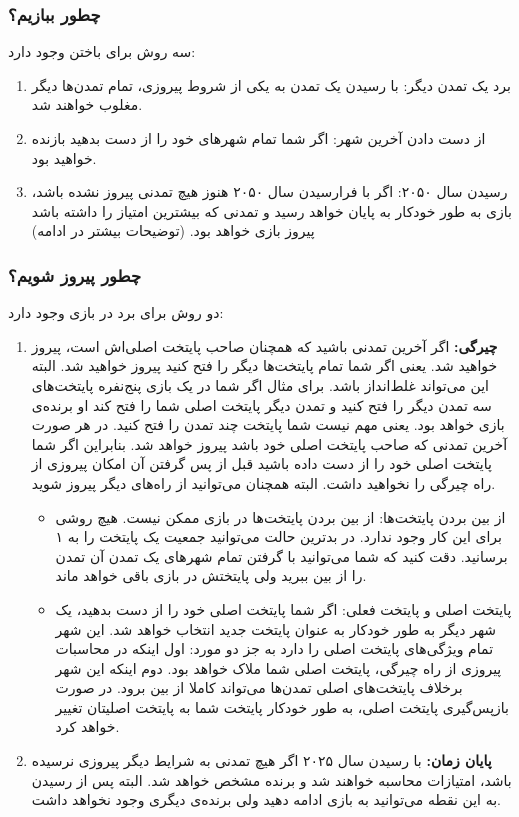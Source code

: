 \documentclass[]{article}
\begin{document}
\subsubsection*{{\titr چطور ببازیم؟}}
سه روش برای باختن وجود دارد:
\begin{enumerate}
	\item برد یک تمدن دیگر: با رسیدن یک تمدن به یکی از شروط پیروزی، تمام تمدن‌ها دیگر مغلوب خواهند شد.
	\item از دست دادن آخرین شهر: اگر شما تمام شهرهای خود را از دست بدهید بازنده خواهید بود.
	\item رسیدن سال ۲۰۵۰: اگر با فرارسیدن سال ۲۰۵۰ هنوز هیچ تمدنی پیروز نشده باشد، بازی به طور خودکار به پایان خواهد رسید و تمدنی که بیشترین امتیاز را داشته باشد پیروز بازی خواهد بود. (توضیحات بیشتر در ادامه)
\end{enumerate}
\subsubsection*{{\titr چطور پیروز شویم؟}}
دو روش برای برد در بازی وجود دارد:
\begin{enumerate}
	\item \textbf{چیرگی:} اگر آخرین تمدنی باشید که همچنان صاحب پایتخت اصلی‌اش است، پیروز خواهید شد. یعنی اگر شما تمام پایتخت‌ها دیگر را فتح کنید پیروز خواهید شد. البته این می‌تواند غلط‌انداز باشد. برای مثال اگر شما در یک بازی پنج‌نفره پایتخت‌های سه تمدن دیگر را فتح کنید و تمدن دیگر پایتخت اصلی شما را فتح کند او برنده‌ی بازی خواهد بود. یعنی مهم نیست شما پایتخت چند تمدن را فتح کنید. در هر صورت آخرین تمدنی که صاحب پایتخت اصلی خود باشد پیروز خواهد شد. بنابراین اگر شما پایتخت اصلی خود را از دست داده باشید قبل از پس گرفتن آن امکان پیروزی از راه چیرگی را نخواهید داشت. البته همچنان می‌توانید از راه‌های دیگر پیروز شوید.
	\begin{itemize}
		\item از بین بردن پایتخت‌ها: از بین بردن پایتخت‌ها در بازی ممکن نیست. هیچ روشی برای این کار وجود ندارد. در بدترین حالت می‌توانید جمعیت یک پایتخت را به ۱ برسانید. دقت کنید که شما می‌توانید با گرفتن تمام شهر‌های یک تمدن آن تمدن را از بین ببرید ولی پایتختش در بازی باقی خواهد ماند.
		\item پایتخت اصلی و پایتخت فعلی: اگر شما پایتخت اصلی خود را از دست بدهید، یک شهر دیگر به طور خودکار به عنوان پایتخت جدید انتخاب خواهد شد. این شهر تمام ویژگی‌های پایتخت اصلی را دارد به  جز دو مورد: اول اینکه در محاسبات پیروزی از راه چیرگی، پایتخت اصلی شما ملاک خواهد بود. دوم اینکه این شهر برخلاف پایتخت‌های اصلی تمدن‌ها می‌تواند کاملا از بین برود. در صورت بازپس‌گیری پایتخت اصلی، به طور خودکار پایتخت شما به پایتخت اصلیتان تغییر خواهد کرد.
	\end{itemize}
	\item \textbf{پایان زمان:} با رسیدن سال ۲۰۲۵ اگر هیچ تمدنی به شرایط دیگر پیروزی نرسیده باشد، امتیازات محاسبه خواهند شد و برنده مشخص خواهد شد. البته پس از رسیدن به این نقطه می‌توانید به بازی ادامه دهید ولی برنده‌‌ی دیگری وجود نخواهد داشت.
\end{enumerate}
\end{document}
